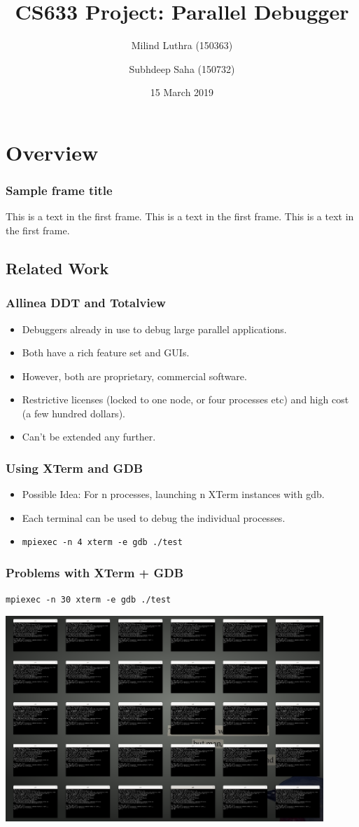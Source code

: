 \documentclass{beamer}
\title{CS633 Project: Parallel Debugger}
\author[Milind, Subhdeep]{Milind Luthra (150363) \and Subhdeep Saha (150732)}
\date{15 March 2019}
\begin{document}
\frame{\titlepage}

\section{Overview}
\begin{frame}
\frametitle{Sample frame title}
This is a text in the first frame. This is a text in the first frame. This is a text in the first frame.
\end{frame}

\subsection{Related Work}

\begin{frame}
  \frametitle{Allinea DDT and Totalview}
  \begin{itemize}
  \item <1-> Debuggers already in use to debug large parallel applications.
  \item <2-> Both have a rich feature set and GUIs.
  \item <3-> However, both are proprietary, commercial software.
  \item <5-> Restrictive licenses (locked to one node, or four processes etc) and high cost (a few hundred dollars).
  \item <6-> Can't be extended any further.
  \end{itemize}
\end{frame}

\begin{frame}[fragile]
  \frametitle{Using XTerm and GDB}
  \begin{itemize}
  \item <1-> Possible Idea: For n processes, launching n XTerm instances with gdb.
  \item <2-> Each terminal can be used to debug the individual processes.
  \item <3-> \texttt{mpiexec -n 4 xterm -e gdb ./test}
  \end{itemize}
\end{frame}

\begin{frame}
  \frametitle{Problems with XTerm + GDB}
  \texttt{mpiexec -n 30 xterm -e gdb ./test}

  \includegraphics[width=0.9\textwidth]{usingxterm}
\end{frame}
\end{document}

